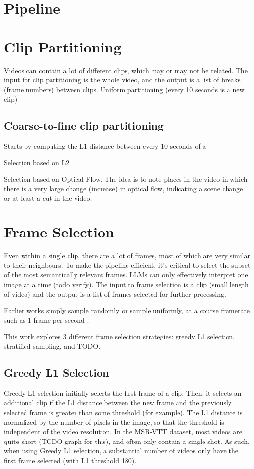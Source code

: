 \documentclass{article}
\begin{document}
\section{Pipeline}




\section{Clip Partitioning}

Videos can contain a lot of different clips, which may or may not be related.
The input for clip partitioning is the whole video, and the output is a list of breaks (frame numbers) between clips.
Uniform partitioning (every 10 seconds is a new clip)
\subsection{Coarse-to-fine clip partitioning}
Starts by computing the L1 distance between every 10 seconds of a 

Selection based on L2

Selection based on Optical Flow.
The idea is to note places in the video in which there is a very large change (increase) in optical flow, indicating a scene change or at least a cut in the video.


\section{Frame Selection}

Even within a single clip, there are a lot of frames, most of which are very similar to their neighbours.
To make the pipeline efficient, it's critical to select the subset of the most semantically relevant frames.
LLMs can only effectively interpret one image at a time (todo verify).
The input to frame selection is a clip (small length of video) and the output is a list of frames selected for further processing.

Earlier works simply sample randomly \cite{TODO} or sample uniformly, at a course framerate such as 1 frame per second \cite{clip4clip}.

This work explores 3 different frame selection strategies:
greedy L1 selection, stratified sampling, and TODO.

\subsection{Greedy L1 Selection}
Greedy L1 selection initially selects the first frame of a clip. Then, it selects an additional clip if the L1 distance between the new frame and the previously selected frame is greater than some threshold (for example).
The L1 distance is normalized by the number of pixels in the image, so that the threshold is independent of the video resolution.
In the MSR-VTT dataset, most videos are quite short (TODO graph for this), and often only contain a single shot.
As such, when using Greedy L1 selection, a substantial number of videos only have the first frame selected (with L1 threshold 180).
\end{document}
